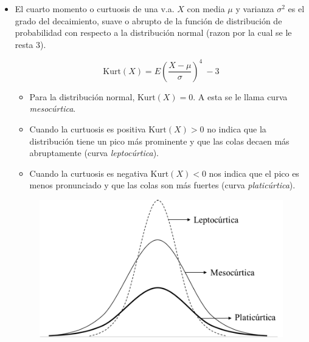 \begin{itemize}
\item El cuarto momento o curtuosis de una v.a. $X$ con media $\mu$ y varianza
$\sigma^2$ es el grado del decaimiento, suave o abrupto de la función de
distribución de probabilidad con respecto a la distribución normal (razon por la
cual se le resta 3).
  
  \begin{equation}
    \text{Kurt}(X) = E(\frac{X-\mu}{\sigma})^4 \ -3
  \end{equation}

    \begin{itemize}
      \item Para la distribución normal, $\text{Kurt}(X)=0$. A esta se le llama curva
            \textit{mesocúrtica}.
    \end{itemize}

    \begin{itemize}
    \item Cuando la curtuosis es positiva $\text{Kurt}(X)>0$ no indica que la
    distribución tiene un pico más prominente y que las colas decaen más
    abruptamente (curva \textit{leptocúrtica}).
    \item Cuando la curtuosis es negativa $\text{Kurt}(X)<0$ nos indica que el pico
    es menos pronunciado y que las colas son más fuertes (curva \textit{platicúrtica}).
      \end{itemize}

    \begin{figure}[h!]
      \centering
      \includegraphics[scale=1]{../slides/figures/curtuosis.png}
    \end{figure}

\end{itemize}

